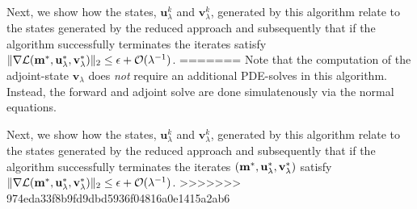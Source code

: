\documentclass{iopart}
\begin{document}
{Next, we show how the states, $\mathbf{u}^k_{\lambda}$ and $\mathbf{v}^k_{\lambda}$, generated by this algorithm  relate to the states generated by the reduced approach and subsequently that if the algorithm successfully terminates the iterates satisfy $\|\nabla\mathcal{L}(\mathbf{m}^*, \mathbf{u}^*_{\lambda}, \mathbf{v}^*_{\lambda})\|_2 \leq \epsilon + \mathcal{O}(\lambda^{-1})$.
=======
Note that the computation of the adjoint-state $\mathbf{v}_{\lambda}$ does \emph{not} require an additional PDE-solves in this algorithm. Instead, the forward and adjoint solve are done simulatenously via the normal equations.

Next, we show how the states, $\mathbf{u}^k_{\lambda}$ and $\mathbf{v}^k_{\lambda}$, generated by this algorithm  relate to the states generated by the reduced approach and subsequently that if the algorithm successfully terminates the iterates $(\mathbf{m}^*, \mathbf{u}^*_{\lambda}, \mathbf{v}^*_{\lambda})$ satisfy $\|\nabla\mathcal{L}(\mathbf{m}^*, \mathbf{u}^*_{\lambda}, \mathbf{v}^*_{\lambda})\|_2 \leq \epsilon + \mathcal{O}(\lambda^{-1})$.
>>>>>>> 974eda33f8b9fd9dbd5936f04816a0e1415a2ab6

}
\end{document}
